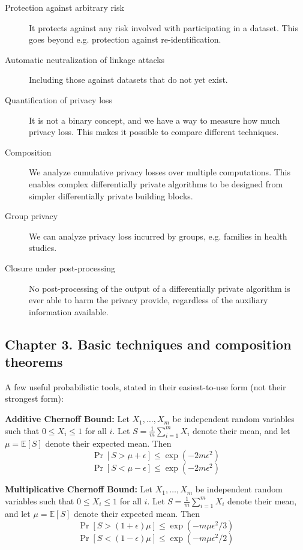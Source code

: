 \documentclass[a4paper]{article}
\begin{document}
\begin{description}
    \item[Protection against arbitrary risk] It protects against any risk involved with participating in a dataset. This goes beyond e.g. protection against re-identification.
    
    \item[Automatic neutralization of linkage attacks] Including those against datasets that do not yet exist.
    
    \item[Quantification of privacy loss] It is not a binary concept, and we have a way to measure how much privacy loss. This makes it possible to compare different techniques.
    
    \item[Composition] We analyze cumulative privacy losses over multiple computations. This enables complex differentially private algorithms to be designed from simpler differentially private building blocks.
    
    \item[Group privacy] We can analyze privacy loss incurred by groups, e.g. families in health studies.
    
    \item[Closure under post-processing] No post-processing of the output of a differentially private algorithm is ever able to harm the privacy provide, regardless of the auxiliary information available.
\end{description}

\newpage
\subsection{Chapter 3. Basic techniques and composition theorems}

A few useful probabilistic tools, stated in their easiest-to-use form (not their strongest form):

\begin{mdframed}
    \textbf{Additive Chernoff Bound:} Let $X_1, \dots, X_m$ be independent random variables such that $0 \leq X_i \leq 1$ for all $i$. Let $S = \frac{1}{m} \sum_{i=1}^m X_i$ denote their mean, and let $\mu = \mathds{E}[S]$ denote their expected mean. Then
    $$\Pr[S > \mu + \epsilon] \leq \exp(-2m\epsilon^2)$$
    $$\Pr[S < \mu - \epsilon] \leq \exp(-2m\epsilon^2)$$
\end{mdframed}

\begin{mdframed}
    \textbf{Multiplicative Chernoff Bound:} Let $X_1, \dots, X_m$ be independent random variables such that $0 \leq X_i \leq 1$ for all $i$. Let $S = \frac{1}{m} \sum_{i=1}^m X_i$ denote their mean, and let $\mu = \mathds{E}[S]$ denote their expected mean. Then
    $$\Pr[S > (1 + \epsilon) \mu] \leq \exp(-m\mu\epsilon^2 / 3)$$
    $$\Pr[S < (1 - \epsilon) \mu] \leq \exp(-m\mu\epsilon^2 / 2)$$
\end{mdframed}
\end{document}
